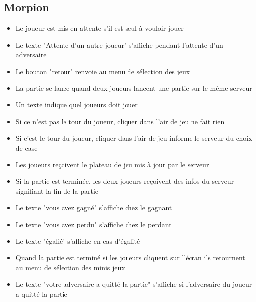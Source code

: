 \documentclass{report}
\begin{document}
\subsection{Morpion}
\begin{itemize}
  \item Le joueur est mis en attente s'il est seul à vouloir jouer
  \item Le texte "Attente d'un autre joueur" s'affiche pendant l'attente d'un adversaire
  \item Le bouton "retour" renvoie au menu de sélection des jeux
  \item La partie se lance quand deux joueurs lancent une partie sur le même serveur
  \item Un texte indique quel joueurs doit jouer
  \item Si ce n'est pas le tour du joueur, cliquer dans l'air de jeu ne fait rien
  \item Si c'est le tour du joueur, cliquer dans l'air de jeu informe le serveur du choix de case
  \item Les joueurs reçoivent le plateau de jeu mis à jour par le serveur
  \item Si la partie est terminée, les deux joueurs reçoivent des infos du serveur signifiant la fin de la partie
  \item Le texte "vous avez gagné" s'affiche chez le gagnant
  \item Le texte "vous avez perdu" s'affiche chez le perdant
  \item Le texte "égalié" s'affiche en cas d'égalité
  \item Quand la partie est terminé si les joueurs cliquent sur l'écran ils retournent au menu de sélection des minis jeux
  \item Le texte "votre adversaire a quitté la partie" s'affiche si l'adversaire du joueur a quitté la partie
\end{itemize}
\end{document}
